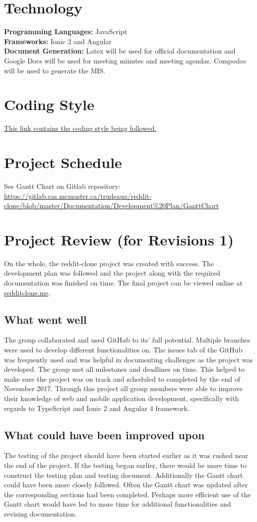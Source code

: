 \documentclass[12pt,fleqn]{article}
\begin{document}
\section {Technology}
\textbf{Programming Languages: }JavaScript \\ 
\textbf{Frameworks: }Ionic 2 and Angular \\
\textbf{Document Generation: } Latex will be used for official documentation and Google Docs will be used for meeting minutes and meeting agendas. Compodoc will be used to generate the MIS.

\section {Coding Style}
 \href{https://google.github.io/styleguide/javascriptguide.xml}{This link contains the coding style being followed.}

\section {Project Schedule}
See Gantt Chart on Gitlab repository: \url{https://gitlab.cas.mcmaster.ca/trudeaua/reddit-clone/blob/master/Documentation/Development\%20Plan/GanttChart}

\section {Project Review (for Revisions 1)}
On the whole, the reddit-clone project was created with success.  The development plan was followed and the project along with the required documentation was finished on time.  The final project can be viewed online at \href{https://redditclone.me/}{redditclone.me}.
\subsection{What went well}
The group collaborated and used GitHub to its' full potential.  Multiple branches were used to develop different functionalities on.  The issues tab of the GitHub was frequently used and was helpful in documenting challenges as the project was developed.  The group met all milestones and deadlines on time.  This helped to make sure the project was on track and scheduled to completed by the end of November 2017.  Through this project all group members were able to improve their knowledge of web and mobile application development, specifically with regards to TypeScript and Ionic 2 and Angular 4 framework.  

\subsection{What could have been improved upon}
The testing of the project should have been started earlier as it was rushed near the end of the project.  If the testing began earlier, there would be more time to construct the testing plan and testing document.  Additionally the Gantt chart could have been more closely followed.  Often the Gantt chart was updated after the corresponding sections had been completed.  Perhaps more efficient use of the Gantt chart would have led to more time for additional functionalities and revising documentation.  
\end{document}

